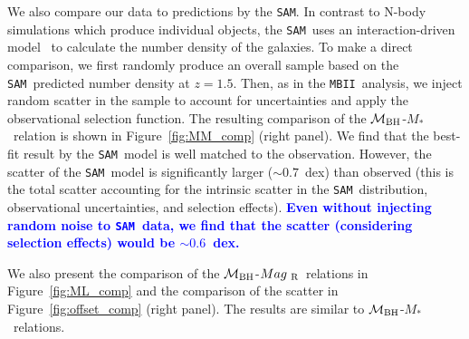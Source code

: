 \documentclass[twocolumn,trackchanges]{aastex63}
\newcommand{\mbh}{$\mathcal M_{\rm BH}$}
\newcommand{\mr}{$Mag_{\rm ~R}$}
\newcommand{\mstar}{{$M_*$}}
\newcommand{\sam}{\texttt{SAM}}
\newcommand{\mbii}{\texttt{MBII}}
\newcommand{\blue}[1]{{\textcolor{blue}{\bf #1}}}
\begin{document}
We also compare our data to predictions by the \sam. In contrast to N-body simulations which produce individual objects, the \sam\ uses an interaction-driven model~\citep{Menci2014} to calculate the number density of the galaxies. To make a direct comparison, we first randomly produce an overall sample based on the \sam\ predicted number density at $z=1.5$. Then, as in the \mbii\ analysis, we inject random scatter in the sample to account for uncertainties and apply the observational selection function. The resulting comparison of the  \mbh-\mstar\ relation is shown in Figure~\ref{fig:MM_comp} (right panel). We find that the best-fit result by the \sam\ model is well matched to the observation. However, the scatter of the \sam\ model is significantly larger ($\sim0.7$~dex) than observed (this is the total scatter accounting for the intrinsic scatter in the \sam\ distribution, observational uncertainties, and selection effects). \blue{Even without injecting random noise to \sam\ data, we find that the scatter (considering selection effects) would be $\sim0.6$~dex.}


We also present the comparison of the \mbh-\mr\ relations in Figure~\ref{fig:ML_comp} and the comparison of the scatter in Figure~\ref{fig:offset_comp} (right panel). The results are similar to \mbh-\mstar\ relations.
\end{document}
